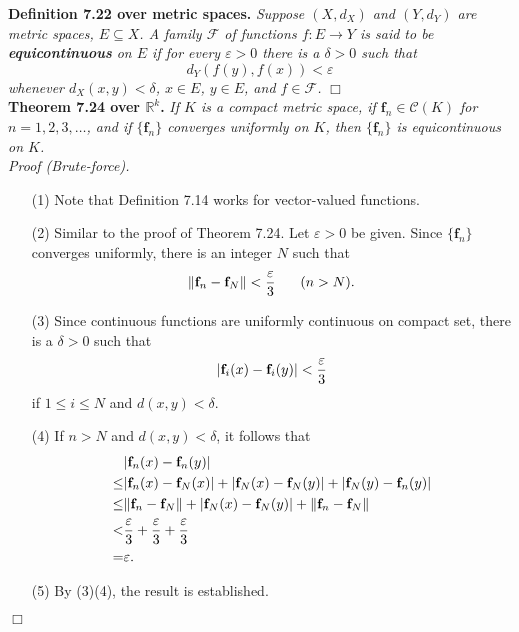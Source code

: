\documentclass{article}
\begin{document}
\textbf{Definition 7.22 over metric spaces.}
\emph{Suppose $(X,d_X)$ and $(Y,d_Y)$ are metric spaces, $E \subseteq X$.
A family $\mathscr{F}$ of functions $f: E \to Y$ is
said to be \textbf{equicontinuous} on $E$
if for every $\varepsilon > 0$ there is a $\delta > 0$ such that
\[
  d_Y(f(y),f(x)) < \varepsilon
\]
whenever $d_X(x,y) < \delta$, $x \in E$, $y \in E$, and $f \in \mathscr{F}$.}
$\Box$ \\



\textbf{Theorem 7.24 over $\mathbb{R}^k$.}
\emph{If $K$ is a compact metric space,
if $\mathbf{f}_n \in \mathscr{C}(K)$ for $n=1,2,3,\ldots$,
and if $\{\mathbf{f}_n\}$ converges uniformly on $K$,
then $\{\mathbf{f}_n\}$ is equicontinuous on $K$.} \\

\emph{Proof (Brute-force).}
\begin{enumerate}
\item[(1)]
  Note that Definition 7.14 works for vector-valued functions.

\item[(2)]
  Similar to the proof of Theorem 7.24.
  Let $\varepsilon > 0$ be given.
  Since $\{\mathbf{f}_n\}$ converges uniformly, there is an integer $N$ such that
  \[
    \norm{ \mathbf{f}_n - \mathbf{f}_N } < \frac{\varepsilon}{3}
    \:\:\:\:\:\:\:\:
    (n > N).
  \]

\item[(3)]
  Since continuous functions are uniformly continuous on compact set,
  there is a $\delta > 0$ such that
  \[
    \abs{ \mathbf{f}_i(x) - \mathbf{f}_i(y) } < \frac{\varepsilon}{3}
  \]
  if $1 \leq i \leq N$ and $d(x,y) < \delta$.

\item[(4)]
  If $n > N$ and $d(x,y) < \delta$, it follows that
  \begin{align*}
    &\abs{\mathbf{f}_n(x)-\mathbf{f}_n(y)} \\
    \leq& \abs{\mathbf{f}_n(x)-\mathbf{f}_N(x)}
     + \abs{\mathbf{f}_N(x)-\mathbf{f}_N(y)}
     + \abs{\mathbf{f}_N(y)-\mathbf{f}_n(y)} \\
    \leq& \norm{ \mathbf{f}_n - \mathbf{f}_N }
     + \abs{\mathbf{f}_N(x)-\mathbf{f}_N(y)}
     + \norm{ \mathbf{f}_n - \mathbf{f}_N } \\
    <& \frac{\varepsilon}{3} + \frac{\varepsilon}{3} + \frac{\varepsilon}{3} \\
    =& \varepsilon.
  \end{align*}

\item[(5)]
By (3)(4), the result is established.
\end{enumerate}
$\Box$ \\
\end{document}

